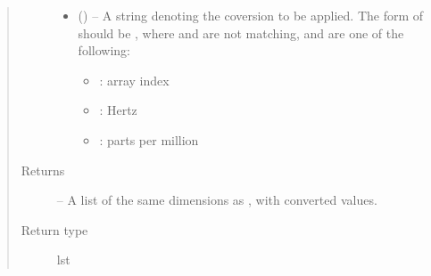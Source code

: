 \documentclass[letterpaper,10pt,english]{sphinxmanual}
\begin{document}
\begin{fulllineitems}
\begin{fulllineitems}
\begin{quote}
\begin{description}
\begin{itemize}
\item {} 
\sphinxAtStartPar
{} () – 
\sphinxAtStartPar
A string denoting the coversion to be applied. The form of
 should be , where  and 
are not matching, and are one of the following:
\begin{itemize}
\item {} 
\sphinxAtStartPar
{}: array index

\item {} 
\sphinxAtStartPar
{}: Hertz

\item {} 
\sphinxAtStartPar
{}: parts per million

\end{itemize}


\end{itemize}

\item[{Returns}] \leavevmode
\sphinxAtStartPar
{} – A list of the same dimensions as , with converted values.

\item[{Return type}] \leavevmode
\sphinxAtStartPar
lst

\end{description}\end{quote}

\end{fulllineitems}


\end{fulllineitems}

\end{document}
